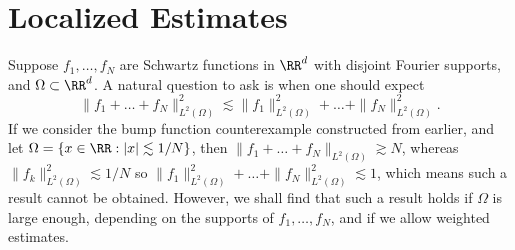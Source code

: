 \begin{comment}
\begin{example}
  TODO: Move this. When $p < 2$, one does not usually expect to find decoupling inequalities in $L^p(\Omega)$. For instance, for any family of disjoint measurable sets $E_1, \dots, E_N \in \Omega$, each with non-negative measure, one can find $f_1, \dots, f_N \in L^p(\Omega)$, with $f_i$ supported on $E_i$ for each $i$ such that
  \begin{align*}
    \| f_1 + \dots + f_N \|_{L^p(\Omega)} &= \left( \| f_1 \|_{L^p(\Omega)}^p + \dots + \| f_N \|_{L^p(\Omega)}^p \right)^{1/p}\\
    &\geq N^{1/p - 1/2} \left( \| f_1 \|_{L^p(\Omega)}^2 + \dots + \| f_N \|_{L^p(\Omega)}^2 \right)^{1/2}.
  \end{align*}
  The idea of this is simple; we just choose a family of scalars $A_1, \dots, A_N$ such that
  \[ (A_1^p + \dots + A_N^p)^{1/p} = N^{1/p - 1/2} (A_1^2 + \dots + A_N^2)^{1/2}. \]
  Given functions $f_1, \dots, f_N$ such that $f_i$ is supported in $E_i$ for each $i$, we need only rescale each function such that $\| f_i \|_{L^p(\Omega)} = A_i$ for each $i$. Similarily, if $U_1, \dots, U_N$ are disjoint open sets in $\RR^d$, we can find Schwartz functions $f_1, \dots, f_N$, such that $f_i$ has Fourier support in $U_i$ for each $i$, such that
  \[ \| f_1 + \dots + f_N \|_{L^p(\Omega)} \gtrsim N^{1/p - 1/2} \left( \| f_1 \|_{L^p(\Omega)}^2 + \dots + \| f_N \|_{L^p(\Omega)}^2 \right)^{1/2}, \]
  where the implict constant is independant of $N$, and $U_1, \dots, U_N$. The idea here is to begin with Schwarz functions $f_1, \dots, f_N$ such that $f_i$ has Fourier suppport in $U_i$, and then replace these Schwarz functions with translations such that the masses of the $f_i$ are essentially disjoint from one another, which only modulates the Fourier transform and so does not affect the Fourier support of the functions. Rescaling then gives the result.
\end{example}
\end{comment}

\section{Localized Estimates}

Suppose $f_1, \dots, f_N$ are Schwartz functions in $\RR^d$ with disjoint Fourier supports, and $\Omega \subset \RR^d$. A natural question to ask is when one should expect
%
\[ \| f_1 + \dots + f_N \|_{L^2(\Omega)}^2 \lesssim \| f_1 \|_{L^2(\Omega)}^2 + \dots + \| f_N \|_{L^2(\Omega)}^2. \]
%
If we consider the bump function counterexample constructed from earlier, and let $\Omega = \{ x \in \RR: |x| \lesssim 1/N \}$, then $\| f_1 + \dots + f_N \|_{L^2(\Omega)} \gtrsim N$, whereas $\| f_k \|_{L^2(\Omega)}^2 \lesssim 1/N$ so $\| f_1 \|_{L^2(\Omega)}^2 + \dots + \| f_N \|_{L^2(\Omega)}^2 \lesssim 1$, which means such a result cannot be obtained. However, we shall find that such a result holds if $\Omega$ is large enough, depending on the supports of $f_1, \dots, f_N$, and if we allow weighted estimates.

